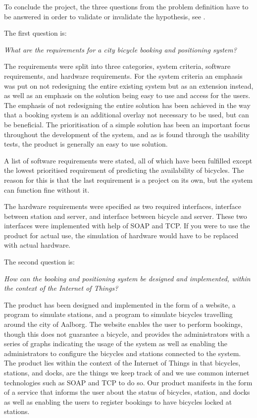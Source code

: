 To conclude the project, the three questions from the problem definition have to be answered in order to validate or invalidate the hypothesis, see .

The first question is:
\begin{center}
	\textit{What are the requirements for a city bicycle booking and positioning system?}
\end{center}

The requirements were split into three categories, system criteria, software requirements, and hardware requirements.
For the system criteria an emphasis was put on not redesigning the entire existing system but as an extension instead, as well as an emphasis on the solution being easy to use and access for the users.
The emphasis of not redesigning the entire solution has been achieved in the way that a booking system is an additional overlay not necessary to be used, but can be beneficial.
The prioritisation of a simple solution has been an important focus throughout the development of the system, and as is found through the usability tests, the product is generally an easy to use solution.

A list of software requirements were stated, all of which have been fulfilled except the lowest prioritised requirement of predicting the availability of bicycles. The reason for this is that the last requirement is a project on its own, but the system can function fine without it.

The hardware requirements were specified as two required interfaces, interface between station and server, and interface between bicycle and server.
These two interfaces were implemented with help of SOAP and TCP. 
If you were to use the product for actual use, the simulation of hardware would have to be replaced with actual hardware.

The second question is:
\begin{center}
	\textit{How can the booking and positioning system be designed and implemented, within the context of the Internet of Things?}
\end{center}

The product has been designed and implemented in the form of a website, a program to simulate stations, and a program to simulate bicycles travelling around the city of Aalborg.
The website enables the user to perform bookings, though this does not guarantee a bicycle, and provides the administrators with a series of graphs indicating the usage of the system as well as enabling the administrators to configure the bicycles and stations connected to the system.
The product lies within the context of the Internet of Things in that bicycles, stations, and docks, are the things we keep track of and we use common internet technologies such as SOAP and TCP to do so.
Our product manifests in the form of a service that informs the user about the status of bicycles, station, and docks as well as enabling the users to register bookings to have bicycles locked at stations.

